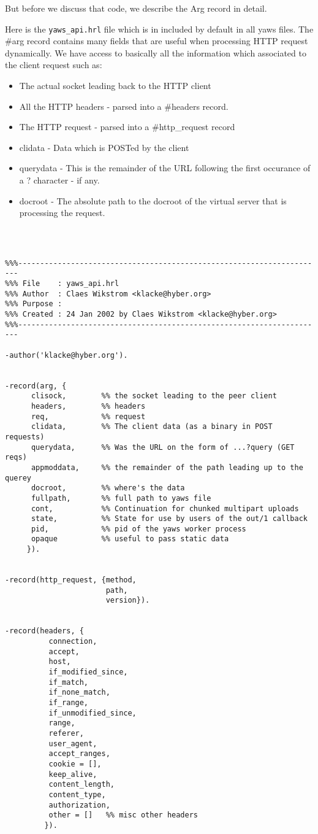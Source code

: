 \documentclass[11pt,oneside,english]{book}
\begin{document}
But before we discuss that code, we describe the Arg record  
in detail.

Here is the \verb+yaws_api.hrl+ file which is in included by default
in all yaws files. The \#arg{} record contains many fields that are
useful when processing HTTP request dynamically.
We have access to basically all the information which associated to the
client request such as:
\begin{itemize}

\item The actual socket leading back to the HTTP client
\item All the HTTP headers - parsed into a \#headers record.
\item The HTTP request - parsed into a \#http\_request record
\item clidata - Data which is POSTed by the client
\item querydata - This is the remainder of the URL following the first 
occurance of a ? character - if any.
\item docroot - The absolute path to the docroot of the virtual server
that is processing the request.
\end{itemize}



\begin{verbatim}



%%%----------------------------------------------------------------------
%%% File    : yaws_api.hrl
%%% Author  : Claes Wikstrom <klacke@hyber.org>
%%% Purpose : 
%%% Created : 24 Jan 2002 by Claes Wikstrom <klacke@hyber.org>
%%%----------------------------------------------------------------------

-author('klacke@hyber.org').


-record(arg, {
	  clisock,        %% the socket leading to the peer client
	  headers,        %% headers
	  req,            %% request
	  clidata,        %% The client data (as a binary in POST requests)
	  querydata,      %% Was the URL on the form of ...?query (GET reqs)
	  appmoddata,     %% the remainder of the path leading up to the querey
	  docroot,        %% where's the data
	  fullpath,       %% full path to yaws file
	  cont,           %% Continuation for chunked multipart uploads
	  state,          %% State for use by users of the out/1 callback
	  pid,            %% pid of the yaws worker process
	  opaque          %% useful to pass static data
	 }).              


-record(http_request, {method,
                       path,
                       version}).

            
-record(headers, {
          connection,
          accept,
          host,
          if_modified_since,
          if_match,
          if_none_match,
          if_range,
          if_unmodified_since,
          range,
          referer,
          user_agent,
          accept_ranges,
          cookie = [],
          keep_alive,
          content_length,
          content_type,
          authorization,
          other = []   %% misc other headers
         }).

\end{verbatim}
\end{document}
